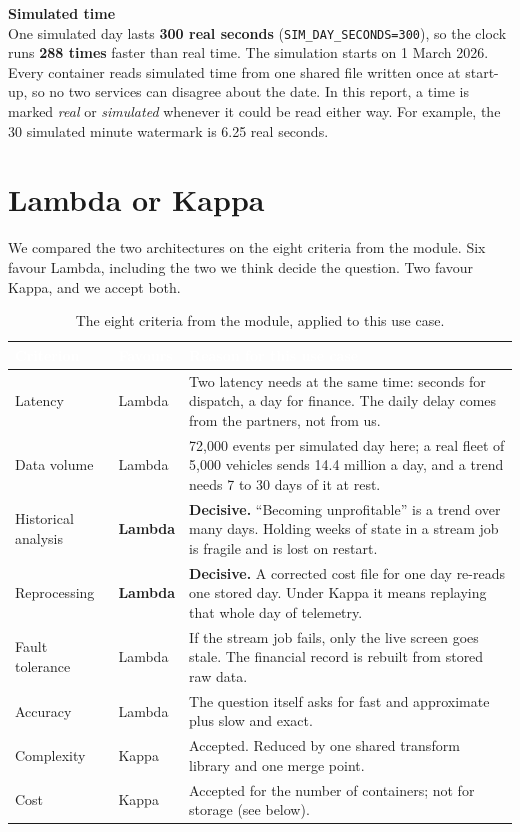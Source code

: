 \documentclass[11pt,a4paper]{article}
\newcommand{\hd}[1]{\textcolor{white}{\textbf{#1}}}
\newcommand{\callout}[2]{%
  \begin{calloutbox}\textbf{\textcolor{accent}{#1}}\\[2pt]#2\end{calloutbox}}
\begin{document}
\callout{Simulated time}{One simulated day lasts \textbf{300 real seconds}
(\texttt{SIM\_DAY\_SECONDS=300}), so the clock runs \textbf{288 times} faster than
real time. The simulation starts on 1 March 2026. Every container reads simulated
time from one shared file written once at start-up, so no two services can disagree
about the date. In this report, a time is marked \emph{real} or \emph{simulated}
whenever it could be read either way. For example, the 30 simulated minute watermark
is 6.25 real seconds.}

\section{Lambda or Kappa}
\label{sec:arch}

We compared the two architectures on the eight criteria from the module. Six favour
Lambda, including the two we think decide the question. Two favour Kappa, and we
accept both.

\begin{table}[htbp]\centering\small
\begin{tabularx}{\linewidth}{|l|l|X|}
\hline
\rowcolor{tablehead}\hd{Criterion} & \hd{Favours} & \hd{Reason for this use case} \\ \hline
Latency & Lambda & Two latency needs at the same time: seconds for dispatch, a day for finance. The daily delay comes from the partners, not from us. \\ \hline
Data volume & Lambda & 72{,}000 events per simulated day here; a real fleet of 5{,}000 vehicles sends 14.4 million a day, and a trend needs 7 to 30 days of it at rest. \\ \hline
Historical analysis & \textbf{Lambda} & \textbf{Decisive.} ``Becoming unprofitable'' is a trend over many days. Holding weeks of state in a stream job is fragile and is lost on restart. \\ \hline
Reprocessing & \textbf{Lambda} & \textbf{Decisive.} A corrected cost file for one day re-reads one stored day. Under Kappa it means replaying that whole day of telemetry. \\ \hline
Fault tolerance & Lambda & If the stream job fails, only the live screen goes stale. The financial record is rebuilt from stored raw data. \\ \hline
Accuracy & Lambda & The question itself asks for fast and approximate plus slow and exact. \\ \hline
Complexity & Kappa & Accepted. Reduced by one shared transform library and one merge point. \\ \hline
Cost & Kappa & Accepted for the number of containers; not for storage (see below). \\ \hline
\end{tabularx}
\caption{The eight criteria from the module, applied to this use case.}
\end{table}
\end{document}
